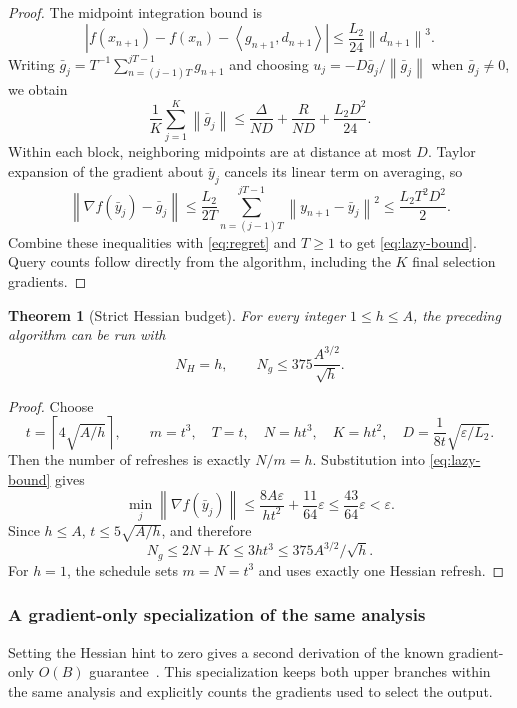 \documentclass[11pt]{article}
\newtheorem{theorem}{Theorem}[section]
\theoremstyle{remark}
\theoremstyle{remark}
\newcommand{\eps}{\varepsilon}
\newcommand{\norm}[1]{\left\lVert#1\right\rVert}
\newcommand{\ip}[2]{\left\langle#1,#2\right\rangle}
\begin{document}
\begin{proof}
The midpoint integration bound is
\[
 \left|f(x_{n+1})-f(x_n)-\ip{g_{n+1}}{d_{n+1}}\right|
 \le\frac{L_2}{24}\norm{d_{n+1}}^3.
\]
Writing $\bar g_j=T^{-1}\sum_{n=(j-1)T}^{jT-1}g_{n+1}$ and choosing
$u_j=-D\bar g_j/\norm{\bar g_j}$ when $\bar g_j\ne0$, we obtain
\[
 \frac1K\sum_{j=1}^K\norm{\bar g_j}
 \le\frac{\Delta}{ND}+\frac{R}{ND}+\frac{L_2D^2}{24}.
\]
Within each block, neighboring midpoints are at distance at most $D$. Taylor expansion of the gradient about $\bar y_j$ cancels its linear term on averaging, so
\[
 \norm{\nabla f(\bar y_j)-\bar g_j}
 \le\frac{L_2}{2T}\sum_{n=(j-1)T}^{jT-1}\norm{y_{n+1}-\bar y_j}^2
 \le\frac{L_2T^2D^2}{2}.
\]
Combine these inequalities with \eqref{eq:regret} and $T\ge1$ to get \eqref{eq:lazy-bound}. Query counts follow directly from the algorithm, including the $K$ final selection gradients.
\end{proof}

\begin{theorem}[Strict Hessian budget]\label{thm:strict}
For every integer $1\le h\le A$, the preceding algorithm can be run with
\[
 N_H=h,\qquad N_g\le375\frac{A^{3/2}}{\sqrt h}.
\]
\end{theorem}
\begin{proof}
Choose
\[
 t=\left\lceil4\sqrt{A/h}\right\rceil,\qquad
 m=t^3,\quad T=t,\quad N=ht^3,\quad K=ht^2,\quad
 D=\frac1{8t}\sqrt{\eps/L_2}.
\]
Then the number of refreshes is exactly $N/m=h$. Substitution into \eqref{eq:lazy-bound} gives
\[
 \min_j\norm{\nabla f(\bar y_j)}
 \le\frac{8A\eps}{ht^2}+\frac{11}{64}\eps
 \le\frac{43}{64}\eps<\eps.
\]
Since $h\le A$, $t\le5\sqrt{A/h}$, and therefore
\[
 N_g\le2N+K\le3ht^3\le375A^{3/2}/\sqrt h.
\]
For $h=1$, the schedule sets $m=N=t^3$ and uses exactly one Hessian refresh.
\end{proof}

\subsubsection{A gradient-only specialization of the same analysis}
Setting the Hessian hint to zero gives a second derivation of the known gradient-only $O(B)$ guarantee~\cite{lilin}. This specialization keeps both upper branches within the same analysis and explicitly counts the gradients used to select the output.
\end{document}
